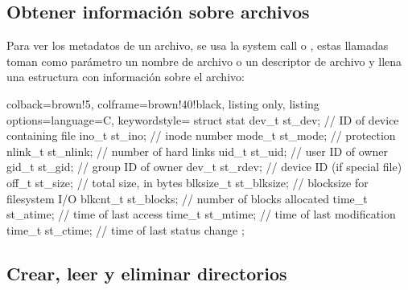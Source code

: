 \documentclass[openany]{book}
\begin{document}
\subsection{Obtener información sobre archivos}

Para ver los metadatos de un archivo, se usa la system call  o , estas llamadas toman como parámetro un nombre de archivo o un descriptor de archivo y llena una estructura con información sobre el archivo: 
\begin{tcblisting}{colback=brown!5, colframe=brown!40!black, listing only, listing options={language=C, keywordstyle=\color{blue!35!white}\bfseries}}
struct stat {
    dev_t st_dev;         // ID of device containing file
    ino_t st_ino;         // inode number
    mode_t st_mode;       // protection
    nlink_t st_nlink;     // number of hard links
    uid_t st_uid;         // user ID of owner
    gid_t st_gid;         // group ID of owner
    dev_t st_rdev;        // device ID (if special file)
    off_t st_size;        // total size, in bytes
    blksize_t st_blksize; // blocksize for filesystem I/O
    blkcnt_t st_blocks;   // number of blocks allocated
    time_t st_atime;      // time of last access
    time_t st_mtime;      // time of last modification
    time_t st_ctime;      // time of last status change
};
\end{tcblisting}        

\subsection{Crear, leer y eliminar directorios}
\end{document}
